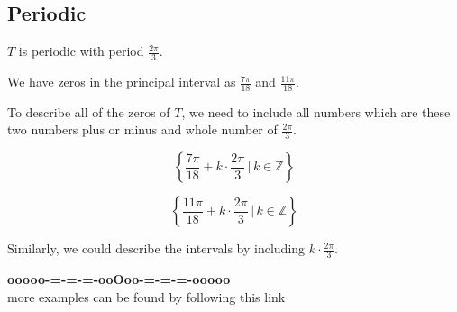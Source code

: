 \documentclass{ximera}
\begin{document}
\subsection*{Periodic}

$T$ is periodic with period $\frac{2\pi}{3}$. 



We have zeros in the principal interval as $\frac{7\pi}{18}$ and $\frac{11\pi}{18}$. 


To describe all of the zeros of $T$, we need to include all numbers which are these two numbers plus or minus and whole number of $\frac{2\pi}{3}$. 



\[
\left\{  \frac{7\pi}{18} + k  \cdot \frac{2\pi}{3}  \, | \,  k \in \mathbb{Z}         \right\}
\]



\[
\left\{  \frac{11\pi}{18} + k  \cdot \frac{2\pi}{3}  \, | \,  k \in \mathbb{Z}         \right\}
\]




Similarly, we could describe the intervals by including $k  \cdot \frac{2\pi}{3} $. 












\begin{onlineOnly}
\begin{center}
\textbf{\textcolor{green!50!black}{ooooo-=-=-=-ooOoo-=-=-=-ooooo}} \\

more examples can be found by following this link\\ 

\end{center}
\end{onlineOnly}
\end{document}
